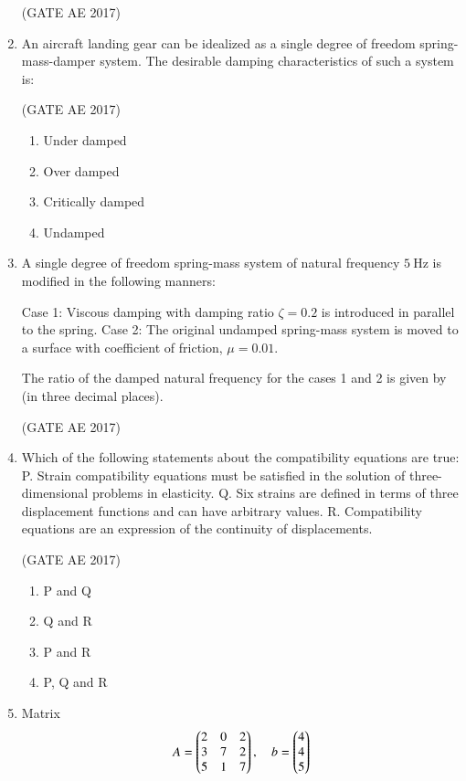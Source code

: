 \documentclass[journal,12pt,onecolumn]{IEEEtran}
\theoremstyle{remark}
\begin{document}
\begin{flushleft}
\begin{enumerate}
\hfill (GATE AE 2017)

\item An aircraft landing gear can be idealized as a single degree of freedom spring-mass-damper system. The desirable damping characteristics of such a system is:  

\hfill (GATE AE 2017)

\begin{multicols}{2}
\begin{enumerate}
\item Under damped
\item Over damped
\item Critically damped
\item Undamped
\end{enumerate}
\end{multicols}

\item A single degree of freedom spring-mass system of natural frequency $5 \ \text{Hz}$ is modified in the following manners:  

Case 1: Viscous damping with damping ratio $\zeta = 0.2$ is introduced in parallel to the spring.  
Case 2: The original undamped spring-mass system is moved to a surface with coefficient of friction, $\mu = 0.01$.  

The ratio of the damped natural frequency for the cases 1 and 2 is given by \underline{\hspace{2cm}} (in three decimal places).  

\hfill (GATE AE 2017)

\item Which of the following statements about the compatibility equations are true:  
P. Strain compatibility equations must be satisfied in the solution of three-dimensional problems in elasticity.  
Q. Six strains are defined in terms of three displacement functions and can have arbitrary values.  
R. Compatibility equations are an expression of the continuity of displacements.  

\hfill (GATE AE 2017)

\begin{enumerate}
\item P and Q
\item Q and R
\item P and R
\item P, Q and R
\end{enumerate}

\item Matrix 
\[
A = \begin{pmatrix}2 & 0 & 2 \\ 3 & 7 & 2 \\ 5 & 1 & 7\end{pmatrix}, \quad 
b = \begin{pmatrix}4 \\ 4 \\ 5\end{pmatrix}
\]  


\end{enumerate}
\end{flushleft}
\end{document}
